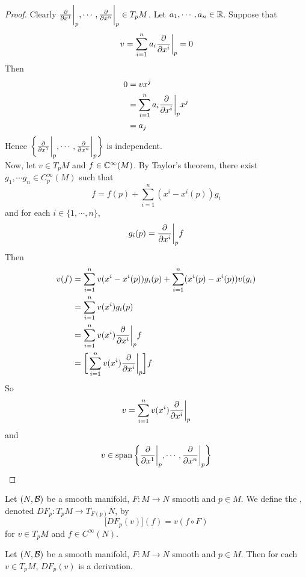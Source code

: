 \documentclass{book}
\begin{document}
	\begin{proof}
		Clearly $\frac{\partial}{\partial x^1} \bigg|_p, \cdots, \frac{\partial}{\partial x^n} \bigg|_p \in T_pM$. Let $a_1, \cdots, a_n \in \mathbb{R}$. Suppose that $$v = \sum_{i=1}^n a_i \frac{\partial}{\partial x^i} \bigg |_p  = 0$$
		Then 
		\begin{align*}
			0
			&= v x^j \\
			&= \sum_{i=1}^n a_i \frac{\partial}{\partial x^i} \bigg |_p  x^j \\
			&= a_j
		\end{align*}
		Hence $\bigg \{\frac{\partial}{\partial x^1} \bigg|_p, \cdots, \frac{\partial}{\partial x^n} \bigg|_p \bigg \}$ is independent.\\
		Now, let $v \in T_pM$ and $f \in \mathbb{C}^{\infty}(M)$. By Taylor's theorem, there exist $g_1, \cdots g_n \in C_p^{\infty}(M)$ such that $$f = f(p) + \sum_{i=1}^n(x^i - x^i(p)) g_i$$ and for each $i \in \{1, \cdots, n\}$, $$g_i(p) = \frac{\partial}{\partial x^i} \bigg |_p  f $$ Then 
		\begin{align*}
			v(f)
			&= \sum_{i=1}^nv(x^i - x^i(p)) g_i(p) + \sum_{i=1}^n(x^i(p) - x^i(p)) v(g_i) \\
			&= \sum_{i=1}^nv(x^i)g_i(p) \\
			&= \sum_{i=1}^nv(x^i)\frac{\partial}{\partial x^i} \bigg |_p  f \\
			&= \bigg[ \sum_{i=1}^nv(x^i)\frac{\partial}{\partial x^i} \bigg |_p  \bigg] f
		\end{align*}
		So $$v = \sum_{i=1}^nv(x^i)\frac{\partial}{\partial x^i} \bigg |_p  $$ and $$v \in \operatorname{span} \bigg \{\frac{\partial}{\partial x^1} \bigg|_p, \cdots, \frac{\partial}{\partial x^n} \bigg|_p \bigg \}$$
	\end{proof}



	\begin{defn}
		Let $(N, \mathcal{B})$ be a smooth manifold, $F: M \rightarrow N$ smooth and $p \in M$. We define the , denoted $DF_p: T_pM \rightarrow T_{F(p)}N$, by $$\bigg[ DF_p(v) \bigg] (f) = v (f \circ F)$$  for $v \in T_pM$ and $f \in C^{\infty}(N)$.
	\end{defn}
	
	
	
	\begin{ex}
	Let $(N, \mathcal{B})$ be a smooth manifold, $F: M \rightarrow N$ smooth and $p \in M$. Then for each $v \in T_pM$, $DF_p(v)$ is a derivation.
	\end{ex}
	
\end{document}
